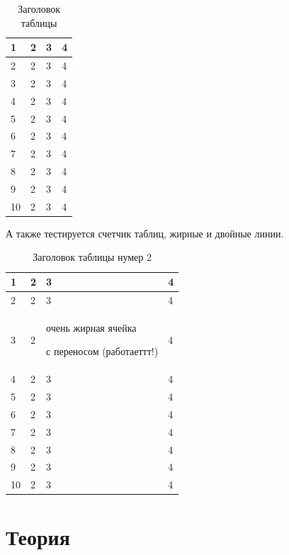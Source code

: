 \documentclass[a4paper,article,14pt]{extarticle}
\begin{document}
\begin{center}
    \begin{longtable}{|p{2cm}|p{3cm}|p{7cm}|p{3cm}|}
    \caption{Заголовок таблицы}\\
    \hline
    1 & 2 & 3 & 4\\
    \hline
    2 & 2 & 3 & 4\\
    \hline
    3 & 2 & 3 & 4\\
    \hline
    4 & 2 & 3 & 4\\
    \hline
    5 & 2 & 3 & 4\\
    \hline
    6 & 2 & 3 & 4\\
    \hline
    7 & 2 & 3 & 4\\
    \hline
    8 & 2 & 3 & 4\\
    \hline
    9 & 2 & 3 & 4\\
    \hline
    10 & 2 & 3 & 4\\
    \hline


    \end{longtable}
\end{center}


А также тестируется счетчик таблиц, жирные и двойные линии.

\begin{center}
    \begin{longtable}{|p{2cm}||p{3cm}|p{7cm}|p{3cm}|}
    \caption{Заголовок таблицы нумер 2}\\
    \hline
    1 & 2 & 3 & 4\\
    \hline
    2 & 2 & 3 & 4\\
    \hline
    3 & 2 & очень жирная ячейка \par с переносом (работаеттт!) & 4\\
    \hline
    4 & 2 & 3 & 4\\
    \hline
    5 & 2 & 3 & 4\\
    \hline
    6 & 2 & 3 & 4\\
    \hline
    7 & 2 & 3 & 4\\
    \hline
    8 & 2 & 3 & 4\\
    \hline
    9 & 2 & 3 & 4\\
    \hline
    10 & 2 & 3 & 4\\
    \hline


    \end{longtable}
\end{center}

\section{Теория}
\end{document}
